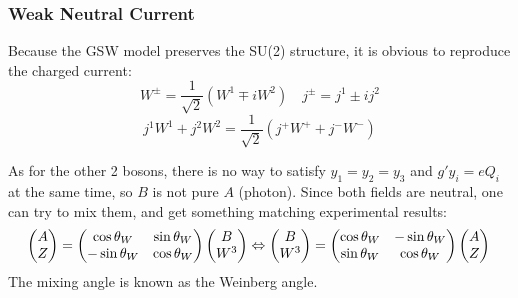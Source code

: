 \subsubsection{Weak Neutral Current}
Because the GSW model preserves the SU(2) structure, 
it is obvious to reproduce the charged current:
\begin{equation}
    W^\pm = \frac{1}{\sqrt{2}}(W^1 \mp iW^2)	\quad
    j^\pm = j^1 \pm ij^2
\end{equation}
\begin{equation}
    j^1W^1 + j^2W^2 = \frac{1}{\sqrt{2}}(j^+W^+ + j^-W^-)
\end{equation}

As for the other 2 bosons, there is no way to satisfy $y_1 = y_2 = y_3$ and 
$g'y_i = eQ_i$ at the same time, so $B$ is not pure $A$ (photon). 
Since both fields are neutral, one can try to mix them, 
and get something matching experimental results:
\begin{equation}
    \begin{pmatrix}
	A   \\
	Z   \\
    \end{pmatrix}
    =
    \begin{pmatrix}
	\cos\theta_W	& \sin\theta_W	\\
	-\sin\theta_W	& \cos\theta_W	\\
    \end{pmatrix}
    \begin{pmatrix}
	B   \\
	W^3 \\
    \end{pmatrix} 
    \Leftrightarrow
    \begin{pmatrix}
	B   \\
	W^3 \\
    \end{pmatrix}
    =
    \begin{pmatrix}
	\cos\theta_W	& -\sin\theta_W	\\
	\sin\theta_W	& \cos\theta_W	\\
    \end{pmatrix}
    \begin{pmatrix}
	A   \\
	Z	\\
    \end{pmatrix} \\
\end{equation}
The mixing angle is known as the Weinberg angle. 

